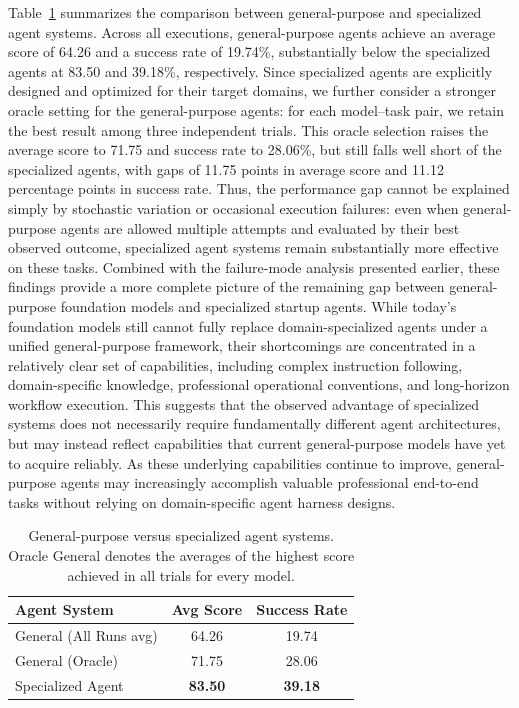 Table~\ref{tab:general_specialized} summarizes the comparison between general-purpose and specialized agent systems. Across all executions, general-purpose agents achieve an average score of 64.26 and a success rate of 19.74\%, substantially below the specialized agents at 83.50 and 39.18\%, respectively. Since specialized agents are explicitly designed and optimized for their target domains, we further consider a stronger oracle setting for the general-purpose agents: for each model--task pair, we retain the best result among three independent trials. This oracle selection raises the average score to 71.75 and success rate to 28.06\%, but still falls well short of the specialized agents, with gaps of 11.75 points in average score and 11.12 percentage points in success rate. Thus, the performance gap cannot be explained simply by stochastic variation or occasional execution failures: even when general-purpose agents are allowed multiple attempts and evaluated by their best observed outcome, specialized agent systems remain substantially more effective on these tasks.
Combined with the failure-mode analysis presented earlier, these findings provide a more complete picture of the remaining gap between general-purpose foundation models and specialized startup agents. While today's foundation models still cannot fully replace domain-specialized agents under a unified general-purpose framework, their shortcomings are concentrated in a relatively clear set of capabilities, including complex instruction following, domain-specific knowledge, professional operational conventions, and long-horizon workflow execution. This suggests that the observed advantage of specialized systems does not necessarily require fundamentally different agent architectures, but may instead reflect capabilities that current general-purpose models have yet to acquire reliably. As these underlying capabilities continue to improve, general-purpose agents may increasingly accomplish valuable professional end-to-end tasks without relying on domain-specific agent harness designs.


\begin{table}[t]
\centering
\small
\caption{General-purpose versus specialized agent systems. Oracle General denotes the averages of the highest score achieved in all trials for every model.}
\label{tab:general_specialized}
\begin{tabular}{lcc}
\toprule
\textbf{Agent System}
& \textbf{Avg Score}
& \textbf{Success Rate} \\
\midrule
General (All Runs avg) & 64.26 & 19.74 \\
General (Oracle) & 71.75 & 28.06 \\
Specialized Agent & \textbf{83.50} & \textbf{39.18} \\
\bottomrule
\end{tabular}
\end{table}

